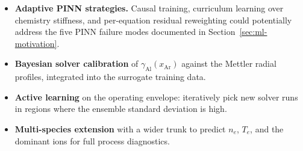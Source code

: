 \begin{itemize}[itemsep=2pt,topsep=2pt]
  \item \textbf{Adaptive PINN strategies.} Causal training, curriculum
  learning over chemistry stiffness, and per-equation residual reweighting
  could potentially address the five PINN failure modes documented in
  Section~\ref{sec:ml-motivation}.
  \item \textbf{Bayesian solver calibration} of $\gamma_\mathrm{Al}(x_\mathrm{Ar})$
  against the Mettler radial profiles, integrated into the surrogate
  training data.
  \item \textbf{Active learning} on the operating envelope: iteratively pick
  new solver runs in regions where the ensemble standard deviation is high.
  \item \textbf{Multi-species extension} with a wider trunk to predict
  $n_e$, $T_e$, and the dominant ions for full process diagnostics.
\end{itemize}

